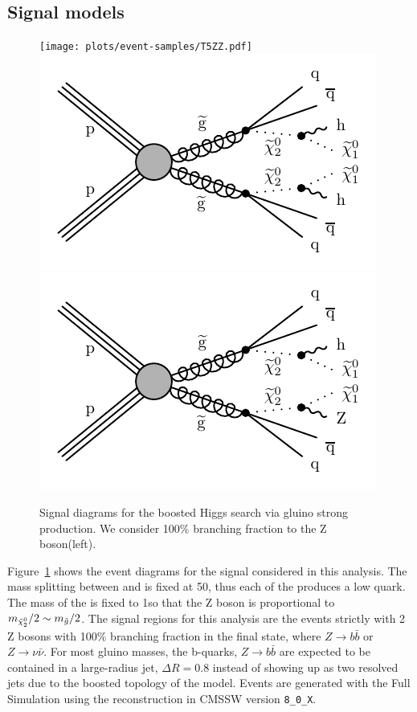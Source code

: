 \subsection{Signal models}
\label{sec:signal-models}

\begin{figure}[htbp!]
\centering
\texttt{[image: plots/event-samples/T5ZZ.pdf]}
\includegraphics[width=0.20\linewidth]{plots/event-samples/T5hh.pdf}
\includegraphics[width=0.20\linewidth]{plots/event-samples/T5Zh.pdf}
\caption{
Signal diagrams for the boosted Higgs search via gluino strong production. We consider 100$\%$ branching fraction to the Z boson(left).
}
\label{fig:T5-event-diagrams}
\end{figure}


Figure~\ref{fig:T5-event-diagrams} shows the event diagrams for the signal considered in this analysis. The mass splitting between \gluino and \NLSP is fixed at 50\gev, thus each of the \gluino produces a low \pt quark. The mass of the \LSP is fixed to 1\gev so that the Z boson \pt is proportional to $m_{\tilde{\chi}^0_2}/2\sim m_{\tilde{g}}/2$. The signal regions for this analysis are the events strictly with 2 Z bosons with 100$\%$ branching fraction in the final state, where $Z\rightarrow b\bar{b}$ or $Z\rightarrow\nu\bar{\nu}$. For most gluino masses, the b-quarks, $Z\rightarrow b\bar{b}$ are expected to be contained in a large-radius jet, $\Delta R=0.8$ instead of showing up as two resolved jets due to the boosted topology of the model. Events are generated with the Full Simulation using the reconstruction in CMSSW version \texttt{8\_0\_X}.

